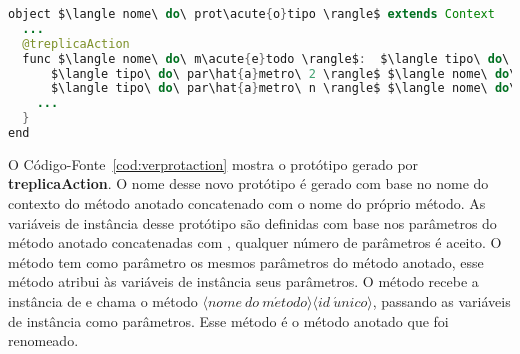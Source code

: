 \begin{lstlisting}[language=Java, caption={Versão original do código-fonte que usa \textbf{treplicaAction}}, label={cod:originalactioncf}, mathescape=true]
object $\langle nome\ do\ prot\acute{o}tipo \rangle$ extends Context
  ...
  @treplicaAction
  func $\langle nome\ do\ m\acute{e}todo \rangle$:  $\langle tipo\ do\ par\hat{a}metro\ 1 \rangle$ $\langle nome\ do\ par\hat{a}metro\ 1 \rangle$, 
      $\langle tipo\ do\ par\hat{a}metro\ 2 \rangle$ $\langle nome\ do\ par\hat{a}metro\ 2 \rangle$, 
      $\langle tipo\ do\ par\hat{a}metro\ n \rangle$ $\langle nome\ do\ par\hat{a}metro\ n \rangle$ {
    ...
  }
end
\end{lstlisting}

O Código-Fonte~\ref{cod:verprotaction} mostra o protótipo gerado por \textbf{treplicaAction}. O nome desse novo protótipo é gerado com base no nome do contexto do método anotado concatenado com o nome do próprio método. As variáveis de instância desse protótipo são definidas com base nos parâmetros do método anotado concatenadas com , qualquer número de parâmetros é aceito. O método  tem como parâmetro os mesmos parâmetros do método anotado, esse método atribui às variáveis de instância seus parâmetros. O método  recebe a instância de  e chama o método $\langle nome\ do\ m\acute{e}todo \rangle$$\langle id\ \acute{u}nico \rangle$, passando as variáveis de instância como parâmetros. Esse método é o método anotado que foi renomeado.

